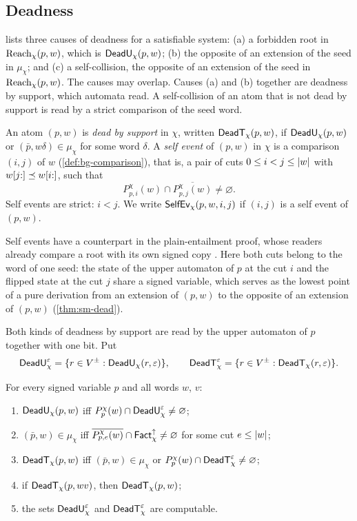 \subsection{Deadness}\label{sec:sm-dead}

 lists three causes of deadness for a satisfiable system:
(a) a forbidden root in $\operatorname{Reach}_\chi(p,w)$, which is $\mathsf{DeadU}_\chi(p,w)$; (b) the
opposite of an extension of the seed in $\mu_\chi$; and (c) a self-collision,
the opposite of an extension of the seed in $\operatorname{Reach}_\chi(p,w)$. The causes may
overlap. Causes (a) and (b) together are deadness by support, which automata
read. A self-collision of an atom that is not dead by support is read by a
strict comparison of the seed word.

\begin{definition}\label{def:sm-dead}
An atom $(p,w)$ is \emph{dead by support} in $\chi$, written
$\mathsf{DeadT}_\chi(p,w)$, if $\mathsf{DeadU}_\chi(p,w)$ or $(\bar p,w\delta)\in\mu_\chi$ for
some word $\delta$. A \emph{self event} of $(p,w)$ in $\chi$ is a comparison
$(i,j)$ of $w$ (\cref{def:bg-comparison}), that is, a pair of cuts
$0\le i<j\le\lvert w\rvert$ with $w[j{:}]\preceq w[i{:}]$, such that
\[
 P^\chi_{p,i}(w)\cap\overline{P^\chi_{p,j}(w)}\ne\varnothing .
\]
Self events are strict: $i<j$. We write $\mathsf{SelfEv}_\chi(p,w,i,j)$ if $(i,j)$ is
a self event of $(p,w)$.
\end{definition}

Self events have a counterpart in the plain-entailment proof, whose readers
already compare a root with its own signed copy \citep{Zhao26}. Here
both cuts belong to the word of one seed: the state of the upper automaton of
$p$ at the cut $i$ and the flipped state at the cut $j$ share a signed
variable, which serves as the lowest point of a pure derivation from an
extension of $(p,w)$ to the opposite of an extension of $(p,w)$
(\cref{thm:sm-dead}).

Both kinds of deadness by support are read by the upper automaton of $p$
together with one bit. Put
\[
 \mathsf{DeadU}^\varepsilon_\chi=\{r\in V^\pm:\mathsf{DeadU}_\chi(r,\varepsilon)\},\qquad
 \mathsf{DeadT}^\varepsilon_\chi=\{r\in V^\pm:\mathsf{DeadT}_\chi(r,\varepsilon)\}.
\]

\begin{lemma}\label{lem:sm-dead-states}
For every signed variable $p$ and all words $w$, $v$:
\begin{enumerate}[leftmargin=*]
\item $\mathsf{DeadU}_\chi(p,w)$ iff $P^\chi_p(w)\cap\mathsf{DeadU}^\varepsilon_\chi\ne\varnothing$;
\item $(\bar p,w)\in\mu_\chi$ iff
  $\overline{P^\chi_{p,e}(w)}\cap\mathsf{Fact}^{\uparrow}_{\chi}\ne\varnothing$ for some cut
  $e\le\lvert w\rvert$;
\item $\mathsf{DeadT}_\chi(p,w)$ iff $(\bar p,w)\in\mu_\chi$ or
  $P^\chi_p(w)\cap\mathsf{DeadT}^\varepsilon_\chi\ne\varnothing$;
\item if $\mathsf{DeadT}_\chi(p,wv)$, then $\mathsf{DeadT}_\chi(p,w)$;
\item the sets $\mathsf{DeadU}^\varepsilon_\chi$ and $\mathsf{DeadT}^\varepsilon_\chi$ are computable.
\end{enumerate}
\end{lemma}

